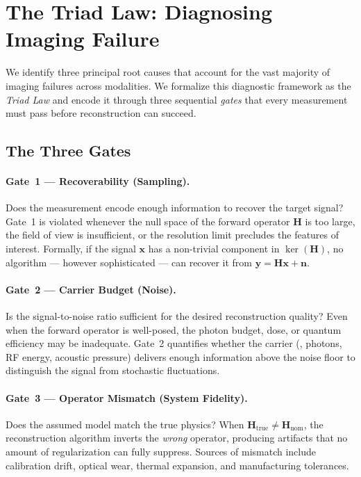 
\section{The Triad Law: Diagnosing Imaging Failure}
\label{sec:triad}

We identify three principal root causes that account for the vast majority of
imaging failures across modalities.  We formalize this diagnostic framework as the \emph{Triad Law} and
encode it through three sequential \emph{gates} that every measurement
must pass before reconstruction can succeed.

\subsection{The Three Gates}

\paragraph{Gate~1 --- Recoverability (Sampling).}
Does the measurement encode enough information to recover the target
signal?  Gate~1 is violated whenever the null space of the forward
operator $\mathbf{H}$ is too large, the field of view is insufficient,
or the resolution limit precludes the features of interest.  Formally,
if the signal $\mathbf{x}$ has a non-trivial component in
$\ker(\mathbf{H})$, no algorithm --- however sophisticated --- can
recover it from $\mathbf{y} = \mathbf{H}\mathbf{x} + \mathbf{n}$.

\paragraph{Gate~2 --- Carrier Budget (Noise).}
Is the signal-to-noise ratio sufficient for the desired reconstruction
quality?  Even when the forward operator is well-posed, the photon
budget, dose, or quantum efficiency may be inadequate.  Gate~2
quantifies whether the carrier (\eg, photons, RF energy, acoustic
pressure) delivers enough information above the noise floor to
distinguish the signal from stochastic fluctuations.

\paragraph{Gate~3 --- Operator Mismatch (System Fidelity).}
Does the assumed model match the true physics?  When
$\mathbf{H}_{\mathrm{true}} \neq \mathbf{H}_{\mathrm{nom}}$, the
reconstruction algorithm inverts the \emph{wrong} operator, producing
artifacts that no amount of regularization can fully suppress.  Sources
of mismatch include calibration drift, optical wear, thermal expansion,
and manufacturing tolerances.

